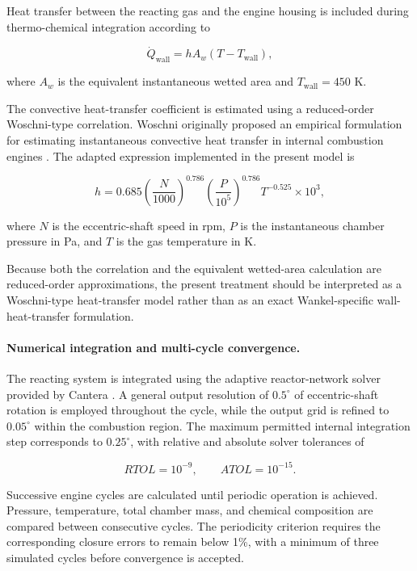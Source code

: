 \documentclass[man,floatsintext,noextraspace]{apa6}
\begin{document}
Heat transfer between the reacting gas and the engine housing is included during thermo-chemical integration according to

\begin{equation}
\dot{Q}_{\mathrm{wall}}
=
hA_w\left(T-T_{\mathrm{wall}}\right),
\end{equation}

where $A_w$ is the equivalent instantaneous wetted area and
$T_{\mathrm{wall}}=450$ K.

The convective heat-transfer coefficient is estimated using a reduced-order Woschni-type correlation. Woschni originally proposed an empirical formulation for estimating instantaneous convective heat transfer in internal combustion engines \cite{Woschni1967}. The adapted expression implemented in the present model is

\begin{equation}
h =
0.685
\left(\frac{N}{1000}\right)^{0.786}
\left(\frac{P}{10^5}\right)^{0.786}
T^{-0.525}
\times10^3,
\end{equation}

where $N$ is the eccentric-shaft speed in rpm, $P$ is the instantaneous chamber pressure in Pa, and $T$ is the gas temperature in K.

Because both the correlation and the equivalent wetted-area calculation are reduced-order approximations, the present treatment should be interpreted as a Woschni-type heat-transfer model rather than as an exact Wankel-specific wall-heat-transfer formulation.

\paragraph{Numerical integration and multi-cycle convergence.}

The reacting system is integrated using the adaptive reactor-network solver provided by Cantera \cite{Cantera2025}. A general output resolution of $0.5^\circ$ of eccentric-shaft rotation is employed throughout the cycle, while the output grid is refined to $0.05^\circ$ within the combustion region. The maximum permitted internal integration step corresponds to $0.25^\circ$, with relative and absolute solver tolerances of

\begin{equation}
RTOL=10^{-9},
\qquad
ATOL=10^{-15}.
\end{equation}

Successive engine cycles are calculated until periodic operation is achieved. Pressure, temperature, total chamber mass, and chemical composition are compared between consecutive cycles. The periodicity criterion requires the corresponding closure errors to remain below 1\%, with a minimum of three simulated cycles before convergence is accepted.
\end{document}

